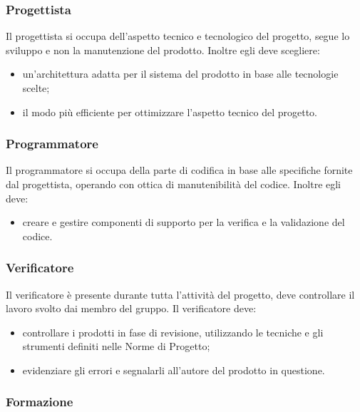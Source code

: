 \subsubsection{Progettista}
Il progettista si occupa dell'aspetto tecnico e tecnologico del progetto, segue lo sviluppo e non la manutenzione del prodotto. Inoltre egli deve scegliere: 
\begin{itemize}
\item un'architettura adatta per il sistema del prodotto in base alle tecnologie scelte;
\item il modo più efficiente per ottimizzare l'aspetto tecnico del progetto.
\end{itemize}
\subsubsection{Programmatore}
Il programmatore si occupa della parte di codifica in base alle specifiche fornite dal progettista, operando con ottica di manutenibilità  del codice. Inoltre egli deve: 
\begin{itemize}
\item creare e gestire componenti di supporto per la verifica e la validazione del codice. 
\end{itemize}

\subsubsection{Verificatore}
Il verificatore è presente durante tutta l'attività   del progetto, deve controllare il lavoro svolto dai membro del gruppo. Il  verificatore deve: 
\begin{itemize}
\item controllare i prodotti in fase di revisione, utilizzando le tecniche e gli strumenti definiti  nelle Norme di Progetto; 
\item evidenziare gli errori e segnalarli all'autore del prodotto in questione.
\end{itemize}

\subsubsection{Formazione}